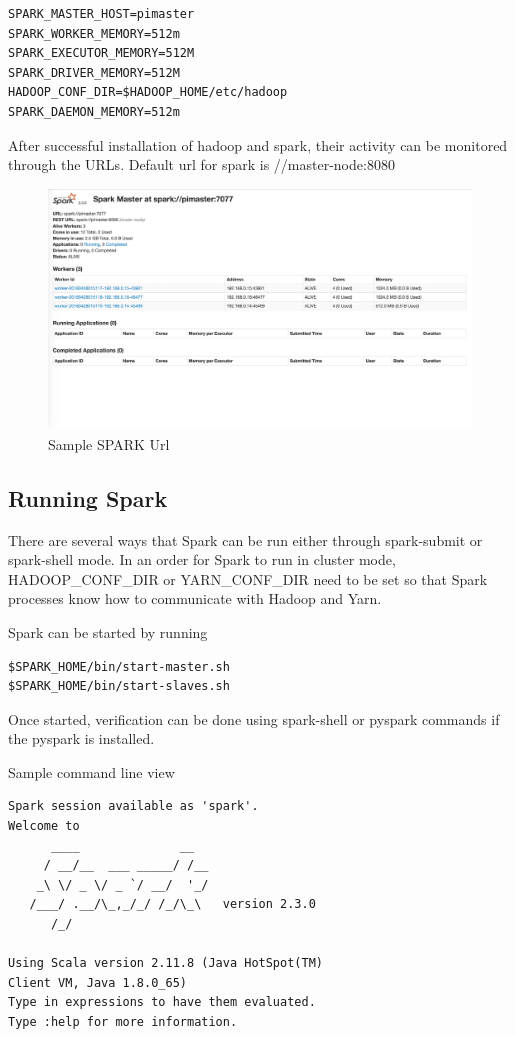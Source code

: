 \begin{verbatim}
SPARK_MASTER_HOST=pimaster
SPARK_WORKER_MEMORY=512m
SPARK_EXECUTOR_MEMORY=512M
SPARK_DRIVER_MEMORY=512M
HADOOP_CONF_DIR=$HADOOP_HOME/etc/hadoop
SPARK_DAEMON_MEMORY=512m
\end{verbatim}

After successful installation of hadoop and spark, their activity 
can be monitored through the URLs. Default url for spark is 
//master-node:8080

\begin{figure}[htbp] 
	\centering
	\includegraphics[width=\columnwidth]{images/sparkurl.jpg}
	\caption{Sample SPARK Url}
\label{fig:sparkurl} 
\end{figure}

\subsection{Running Spark}

There are several ways that Spark can be run either through
spark-submit or spark-shell mode. In an order for Spark to run in
cluster mode, HADOOP\_CONF\_DIR or YARN\_CONF\_DIR need to be set so
that Spark processes know how to communicate with Hadoop and Yarn.

Spark can be started by running

\begin{verbatim}
$SPARK_HOME/bin/start-master.sh
$SPARK_HOME/bin/start-slaves.sh
\end{verbatim}

Once started, verification can be done using spark-shell or pyspark
commands if the pyspark is installed.

Sample command line view

\begin{verbatim}
Spark session available as 'spark'.
Welcome to
      ____              __
     / __/__  ___ _____/ /__
    _\ \/ _ \/ _ `/ __/  '_/
   /___/ .__/\_,_/_/ /_/\_\   version 2.3.0
      /_/
         
Using Scala version 2.11.8 (Java HotSpot(TM) 
Client VM, Java 1.8.0_65)
Type in expressions to have them evaluated.
Type :help for more information.
\end{verbatim}

